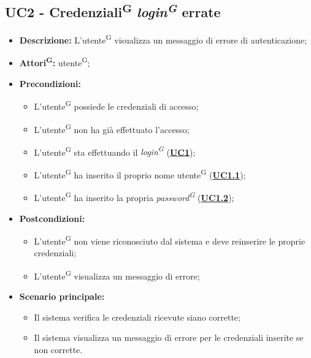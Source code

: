 \subsection{UC2 - Credenziali\textsuperscript{G} \textit{login\textsuperscript{G}} errate}
\label{sec:UC2}
\begin{itemize}
	\item \textbf{Descrizione:} L’utente\textsuperscript{G} visualizza un messaggio di errore di autenticazione;
	\item \textbf{Attori\textsuperscript{G}:} utente\textsuperscript{G};
	\item \textbf{Precondizioni:} 
	\begin{itemize}
		\item L’utente\textsuperscript{G} possiede le credenziali di accesso;
		\item L’utente\textsuperscript{G} non ha già effettuato l’accesso;
		\item L’utente\textsuperscript{G} sta effettuando il \textit{login\textsuperscript{G}} (\hyperref[sec:UC1]{\textbf{UC1}});
		\item L’utente\textsuperscript{G} ha inserito il proprio nome utente\textsuperscript{G} (\hyperref[sec:UC1.1]{\textbf{UC1.1}});
		\item L’utente\textsuperscript{G} ha inserito la propria \textit{password\textsuperscript{G}} (\hyperref[sec:UC1.2]{\textbf{UC1.2}});
	\end{itemize}
	\item \textbf{Postcondizioni:}
	\begin{itemize}
		\item L’utente\textsuperscript{G} non viene riconosciuto dal sistema e deve reinserire le proprie credenziali;
		\item L'utente\textsuperscript{G}  visualizza un messaggio di errore;
	\end{itemize}
	\item \textbf{Scenario principale:} 
	\begin{itemize}
		\item Il sistema verifica le credenziali ricevute siano corrette;
		\item Il sistema visualizza un messaggio di errore per le credenziali inserite se non corrette.
	\end{itemize}
\end{itemize}

